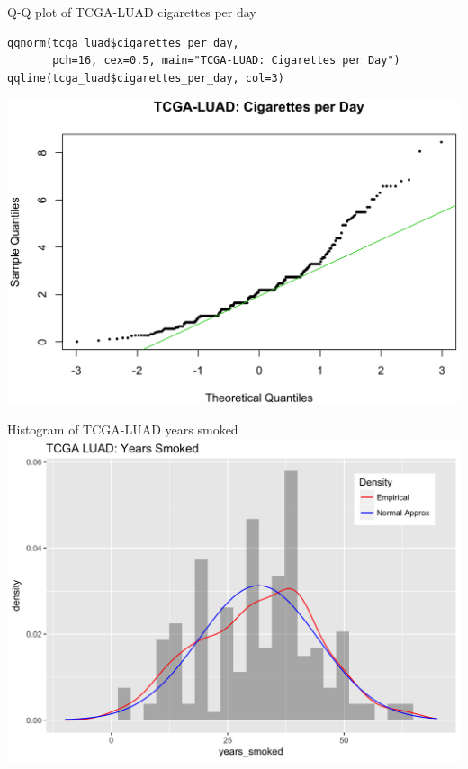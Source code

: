 \documentclass[12pt, t, xcolor=dvipsnames]{beamer}
\begin{document}
\begin{frame}[fragile]{Q-Q plot of TCGA-LUAD cigarettes per day}
\begin{verbatim}
qqnorm(tcga_luad$cigarettes_per_day, 
       pch=16, cex=0.5, main="TCGA-LUAD: Cigarettes per Day")
qqline(tcga_luad$cigarettes_per_day, col=3)
\end{verbatim}
\includegraphics[height=0.6\textheight, keepaspectratio]{qqCpd}
\end{frame}


\begin{frame}{Histogram of TCGA-LUAD years smoked}
\includegraphics[width=\textwidth, keepaspectratio]{histys}
\end{frame}
\end{document}
